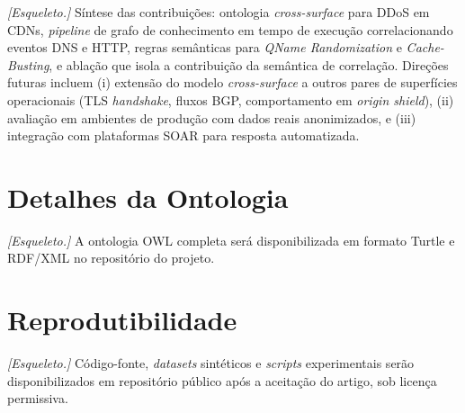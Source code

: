 \documentclass[preprint,12pt]{elsarticle}
\begin{document}
\textit{[Esqueleto.]} Síntese das contribuições: ontologia \emph{cross-surface} para DDoS em CDNs, \emph{pipeline} de grafo de conhecimento em tempo de execução correlacionando eventos DNS e HTTP, regras semânticas para \emph{QName Randomization} e \emph{Cache-Busting}, e ablação que isola a contribuição da semântica de correlação. Direções futuras incluem (i) extensão do modelo \emph{cross-surface} a outros pares de superfícies operacionais (TLS \emph{handshake}, fluxos BGP, comportamento em \emph{origin shield}), (ii) avaliação em ambientes de produção com dados reais anonimizados, e (iii) integração com plataformas SOAR para resposta automatizada.






\appendix

\section{Detalhes da Ontologia}
\label{app:ontology}

\textit{[Esqueleto.]} A ontologia OWL completa será disponibilizada em formato Turtle e RDF/XML no repositório do projeto.

\section{Reprodutibilidade}
\label{app:reproducibility}

\textit{[Esqueleto.]} Código-fonte, \emph{datasets} sintéticos e \emph{scripts} experimentais serão disponibilizados em repositório público após a aceitação do artigo, sob licença permissiva.
\end{document}
